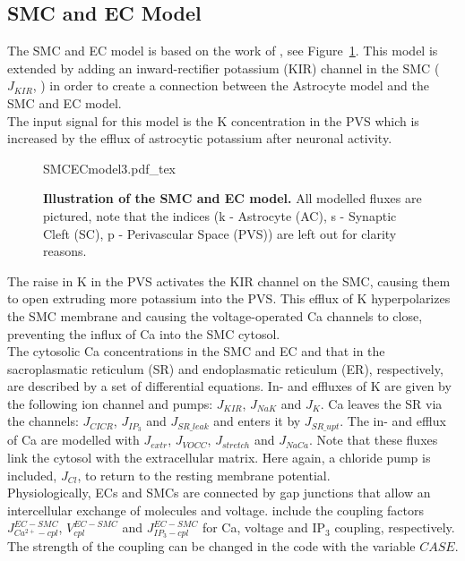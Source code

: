 \subsection{SMC and EC Model}
The SMC and EC model is based on the work of \citet{Koenigsberger2006}, see Figure~\ref{fig:SMCECmodel}. This model is extended by adding an inward-rectifier potassium (KIR) channel in the SMC ($ J_{KIR} $, \cite{Filosa2004}) in order to create a connection between the Astrocyte model and the SMC and EC model. \\%

The input signal for this model is the \gls{K} concentration in the PVS which is increased by the efflux of astrocytic potassium after neuronal activity. 
\begin{figure}[h!]
  \centering
  \def\svgwidth{450pt} %
  \scriptsize
  {SMCECmodel3.pdf_tex}
  \caption{\textbf{Illustration of the SMC and EC model.} All modelled fluxes are pictured, note that the indices (k - Astrocyte (AC), s - Synaptic Cleft (SC), p - Perivascular Space (PVS)) are left out for clarity reasons.}
\label{fig:SMCECmodel}
\end{figure}

The raise in \gls{K} in the PVS activates the KIR channel on the SMC, causing them to open extruding more potassium into the PVS. This efflux of \gls{K} hyperpolarizes the SMC membrane and causing the voltage-operated \gls{Ca} channels to close, preventing the influx of \gls{Ca} into the SMC cytosol.\\

The cytosolic \gls{Ca} concentrations in the SMC and EC and that in the sacroplasmatic reticulum (SR) and endoplasmatic reticulum (ER), respectively, are described by a set of differential equations. In- and effluxes  of \gls{K} are given by the following ion channel and pumps: $ J_{KIR} $, $ J_{NaK} $ and $ J_{K} $. \gls{Ca} leaves the SR via the channels: $ J_{CICR} $, $ J_{IP_3} $ and $ J_{SR\_leak} $ and enters it by $ J_{SR\_upt} $. The in- and efflux of \gls{Ca} are modelled with $ J_{extr} $, $ J_{VOCC} $, $ J_{stretch} $ and $ J_{NaCa} $. Note that these fluxes link the cytosol with the extracellular matrix. Here again, a chloride pump is included, $ J_{Cl} $, to return to the resting membrane potential.\\

Physiologically, ECs and SMCs are connected by gap junctions that allow an intercellular exchange of molecules and voltage.  \citet{Koenigsberger2006} include the coupling factors $J_{Ca^{2+}-cpl}^{EC-SMC}$, $V_{cpl}^{EC-SMC}$ and $J_{IP_{3}-cpl}^{EC-SMC}$ for \gls{Ca}, voltage and IP$ _3 $ coupling, respectively. The strength of the coupling can be changed in the code with the variable $ CASE $.\\

